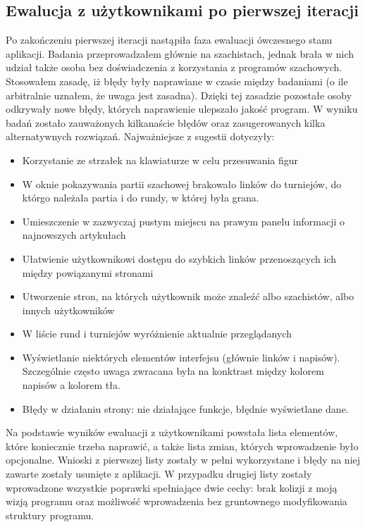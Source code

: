\documentclass[12pt,leqno]{article}
\begin{document}
\subsection{Ewalucja z użytkownikami po pierwszej iteracji}
Po zakończeniu pierwszej iteracji nastąpiła faza ewaluacji ówczesnego stanu aplikacji. Badania przeprowadzałem głównie na szachistach, jednak brała w nich udział także osoba bez doświadczenia z korzystania z programów szachowych. Stosowałem zasadę, iż błędy były naprawiane w czasie między badaniami (o ile arbitralnie uznałem, że uwaga jest zasadna). Dzięki tej zasadzie pozostałe osoby odkrywały nowe błędy, których naprawienie ulepszało jakość program. W wyniku badań zostało zauważonych kilkanaście błędów oraz zasugerowanych kilka alternatywnych rozwiązań. Najważniejsze z sugestii dotyczyły:
\begin{itemize}
\item Korzystanie ze strzałek na klawiaturze w celu przesuwania figur
\item W oknie pokazywania partii szachowej brakowało linków do turniejów, do którgo należała partia i do rundy, w której była grana. 
\item Umieszczenie w zazwyczaj pustym miejscu na prawym panelu informacji o najnowszych artykułach
\item Ułatwienie użytkownikowi dostępu do szybkich linków przenoszących ich między powiązanymi stronami
\item Utworzenie stron, na których użytkownik może znaleźć albo szachistów, albo innych użytkowników
\item W liście rund i turniejów wyróżnienie aktualnie przeglądanych
\item Wyświetlanie niektórych elementów interfejsu (głównie linków i napisów). Szczególnie często uwaga zwracana była na konktrast między kolorem napisów a kolorem tła.
\item Błędy w działaniu strony: nie działające funkcje, błędnie wyświetlane dane. 
\end{itemize}
Na podstawie wyników ewaluacji z użytkownikami powstała lista elementów, które koniecznie trzeba naprawić, a także lista zmian, których wprowadzenie było opcjonalne. Wnioski z pierwszej listy zostały w pełni wykorzystane i błędy na niej zawarte zostały usunięte z aplikacji. W przypadku drugiej listy zostały wprowadzone wszystkie poprawki spełniające dwie cechy: brak kolizji z moją wizją programu oraz możliwość wprowadzenia bez gruntownego modyfikowania struktury programu.
\end{document}
